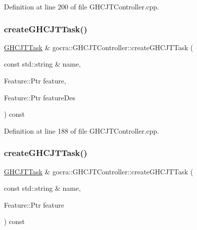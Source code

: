 Definition at line 200 of file G\+H\+C\+J\+T\+Controller.\+cpp.

\hypertarget{classgocra_1_1GHCJTController_a609068ec5ce8fe8afc2f8931aa116c0a}{}\label{classgocra_1_1GHCJTController_a609068ec5ce8fe8afc2f8931aa116c0a} 
\subsubsection{\texorpdfstring{create\+G\+H\+C\+J\+T\+Task()}{createGHCJTTask()}\hspace{0.1cm}{\footnotesize\ttfamily [1/2]}}
{\footnotesize\ttfamily \hyperlink{classgocra_1_1GHCJTTask}{G\+H\+C\+J\+T\+Task} \& gocra\+::\+G\+H\+C\+J\+T\+Controller\+::create\+G\+H\+C\+J\+T\+Task (\begin{DoxyParamCaption}\item[{const std\+::string \&}]{name,  }\item[{Feature\+::\+Ptr}]{feature,  }\item[{Feature\+::\+Ptr}]{feature\+Des }\end{DoxyParamCaption}) const}



Definition at line 188 of file G\+H\+C\+J\+T\+Controller.\+cpp.

\hypertarget{classgocra_1_1GHCJTController_a07f86a1549a1c14050b25a81c7cec210}{}\label{classgocra_1_1GHCJTController_a07f86a1549a1c14050b25a81c7cec210} 
\subsubsection{\texorpdfstring{create\+G\+H\+C\+J\+T\+Task()}{createGHCJTTask()}\hspace{0.1cm}{\footnotesize\ttfamily [2/2]}}
{\footnotesize\ttfamily \hyperlink{classgocra_1_1GHCJTTask}{G\+H\+C\+J\+T\+Task} \& gocra\+::\+G\+H\+C\+J\+T\+Controller\+::create\+G\+H\+C\+J\+T\+Task (\begin{DoxyParamCaption}\item[{const std\+::string \&}]{name,  }\item[{Feature\+::\+Ptr}]{feature }\end{DoxyParamCaption}) const}



